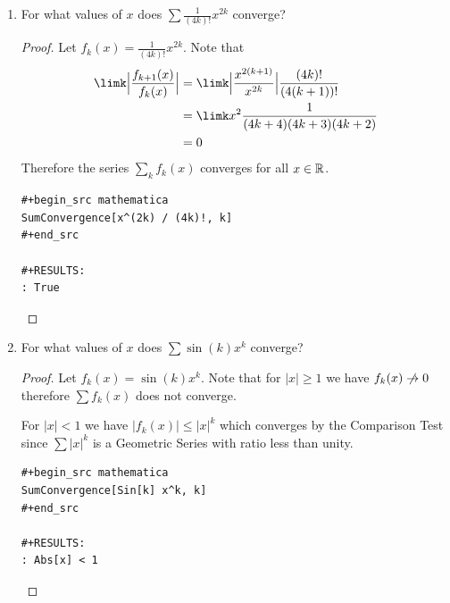 \documentclass[12pt]{article}
\begin{document}
\begin{enumerate}[label=(\alph*)]
\newpage
\item
  \begin{problem*}
    For what values of $x$ does $\sum \frac{1}{(4k)!}x^{2k}$ converge?
  \end{problem*}
  \begin{proof}
    Let $f_k(x) = \frac{1}{(4k)!}x^{2k}$. Note that
    \begin{align*}
      \limk \Big|\frac{f_{k+1}(x)}{f_k(x)}\Big|
      &= \limk \Big| \frac{x^{2(k+1)}}{x^{2k}}\Big|\frac{(4k)!}{(4(k+1))!}\\
      &= \limk x^2 \frac{1}{(4k+4)(4k+3)(4k+2)}\\
      &= 0
    \end{align*}
    Therefore the series $\sum_k f_k(x)$ converges for all $x \in \mathbb{R}$.

\begin{verbatim}
#+begin_src mathematica
SumConvergence[x^(2k) / (4k)!, k]
#+end_src

#+RESULTS:
: True

\end{verbatim}
\checkmark

  \end{proof}

\newpage
\item
  \begin{problem*}
    For what values of $x$ does $\sum \sin(k)x^k$ converge?
  \end{problem*}
  \begin{proof}
    Let $f_k(x) = \sin(k)x^k$. Note that for $|x| \geq 1$ we have $f_k(x) \centernot\to 0$
    therefore $\sum f_k(x)$ does not converge.

    For $|x| < 1$ we have $|f_k(x)| \leq |x|^k$ which converges by the Comparison Test since
    $\sum |x|^k$ is a Geometric Series with ratio less than unity.

\begin{verbatim}
#+begin_src mathematica
SumConvergence[Sin[k] x^k, k]
#+end_src

#+RESULTS:
: Abs[x] < 1

\end{verbatim}
\checkmark
  \end{proof}

\end{enumerate}


\newpage
\subsection{}
\end{document}
